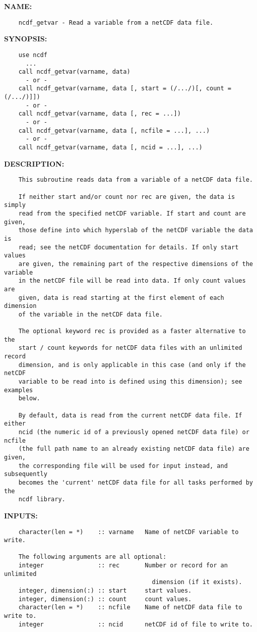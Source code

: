\label{ch:robo114}
\label{ch:Variables_ncdf_getvar}
\textbf{NAME:}\hspace{0.08in}\begin{Verbatim}
    ncdf_getvar - Read a variable from a netCDF data file.
\end{Verbatim}
\textbf{SYNOPSIS:}\hspace{0.08in}\begin{Verbatim}
    use ncdf
      ...
    call ncdf_getvar(varname, data)
      - or -
    call ncdf_getvar(varname, data [, start = (/.../)[, count = (/.../)]])
      - or -
    call ncdf_getvar(varname, data [, rec = ...])
      - or -
    call ncdf_getvar(varname, data [, ncfile = ...], ...)
      - or -
    call ncdf_getvar(varname, data [, ncid = ...], ...)
\end{Verbatim}
\textbf{DESCRIPTION:}\hspace{0.08in}\begin{Verbatim}
    This subroutine reads data from a variable of a netCDF data file.

    If neither start and/or count nor rec are given, the data is simply
    read from the specified netCDF variable. If start and count are given,
    those define into which hyperslab of the netCDF variable the data is
    read; see the netCDF documentation for details. If only start values
    are given, the remaining part of the respective dimensions of the variable
    in the netCDF file will be read into data. If only count values are
    given, data is read starting at the first element of each dimension
    of the variable in the netCDF data file.

    The optional keyword rec is provided as a faster alternative to the
    start / count keywords for netCDF data files with an unlimited record
    dimension, and is only applicable in this case (and only if the netCDF
    variable to be read into is defined using this dimension); see examples
    below.

    By default, data is read from the current netCDF data file. If either
    ncid (the numeric id of a previously opened netCDF data file) or ncfile
    (the full path name to an already existing netCDF data file) are given,
    the corresponding file will be used for input instead, and subsequently
    becomes the 'current' netCDF data file for all tasks performed by the 
    ncdf library.
\end{Verbatim}
\textbf{INPUTS:}\hspace{0.08in}\begin{Verbatim}
    character(len = *)    :: varname   Name of netCDF variable to write.

    The following arguments are all optional:
    integer               :: rec       Number or record for an unlimited
                                         dimension (if it exists).
    integer, dimension(:) :: start     start values.
    integer, dimension(:) :: count     count values.
    character(len = *)    :: ncfile    Name of netCDF data file to write to.
    integer               :: ncid      netCDF id of file to write to.
\end{Verbatim}
